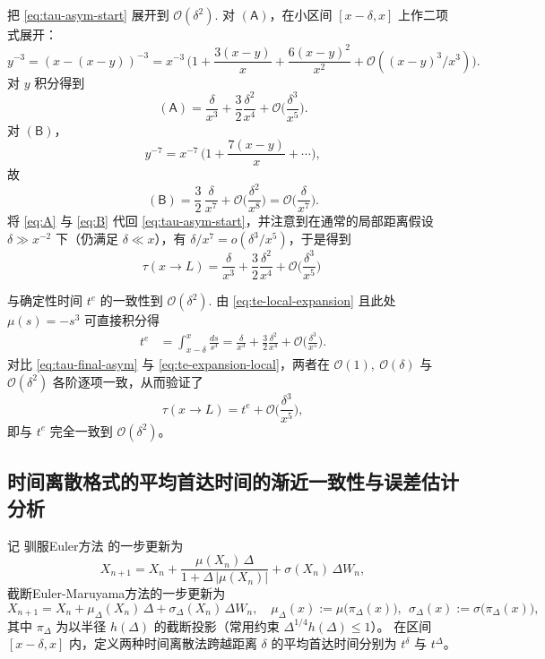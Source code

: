 把 \eqref{eq:tau-asym-start} 展开到 $\mathcal O(\delta^{2})$.	对 $\mathsf{(A)}$，在小区间 \([x-\delta,x]\) 上作二项式展开：
\[
y^{-3}=(x-(x-y))^{-3}
=x^{-3}\,\Big(1+\frac{3(x-y)}{x}+\frac{6(x-y)^{2}}{x^{2}}+\mathcal O((x-y)^{3}/x^{3})\Big).
\]
对 $y$ 积分得到
\begin{equation}\label{eq:A}
	\mathsf{(A)}
	=\frac{\delta}{x^{3}}+\frac{3}{2}\frac{\delta^{2}}{x^{4}}
	+\mathcal O\!\Big(\frac{\delta^{3}}{x^{5}}\Big).
\end{equation}
对 $\mathsf{(B)}$，
\[
y^{-7}=x^{-7}\,\Big(1+\frac{7(x-y)}{x}+\cdots\Big),
\]
故
\begin{equation}\label{eq:B}
	\mathsf{(B)}=\frac{3}{2}\,\frac{\delta}{x^{7}}
	+\mathcal O\!\Big(\frac{\delta^{2}}{x^{8}}\Big)
	=\mathcal O\!\Big(\frac{\delta}{x^{7}}\Big).
\end{equation}
将 \eqref{eq:A} 与 \eqref{eq:B} 代回 \eqref{eq:tau-asym-start}，并注意到在通常的局部距离假设
\(
\delta\gg x^{-2}
\)
下（仍满足 $\delta\ll x$），有
\(
\delta/x^{7}=o(\delta^{3}/x^{5})
\)，于是得到
\begin{equation}\label{eq:tau-final-asym}
	\tau(x\to L)=\frac{\delta}{x^{3}}
	+\frac{3}{2}\frac{\delta^{2}}{x^{4}}
	+\mathcal O\!\Big(\frac{\delta^{3}}{x^{5}}\Big)\ 
\end{equation}

与确定性时间 $t^e$ 的一致性到 $\mathcal O(\delta^{2})$. 由 \eqref{eq:te-local-expansion} 且此处 $\mu(s)=-s^{3}$ 可直接积分得
\begin{align}
	t^e&=\int_{x-\delta}^{x}\frac{ds}{s^{3}}
	=\frac{\delta}{x^{3}}+\frac{3}{2}\frac{\delta^{2}}{x^{4}}
	+\mathcal O\!\Big(\frac{\delta^{3}}{x^{5}}\Big).
	\label{eq:te-expansion-local}
\end{align}
对比 \eqref{eq:tau-final-asym} 与 \eqref{eq:te-expansion-local}，两者在
\(
\mathcal O(1),\ \mathcal O(\delta)
\)
与
\(
\mathcal O(\delta^{2})
\)
各阶逐项一致，从而验证了
\[
\tau(x\to L)=t^e+\mathcal O\!\Big(\frac{\delta^{3}}{x^{5}}\Big),
\]
即与 \(t^e\) 完全一致到 \(\mathcal O(\delta^{2})\)。




\subsection{时间离散格式的平均首达时间的渐近一致性与误差估计分析}

记 驯服Euler方法 的一步更新为
\[
X_{n+1}
=
X_n
+\frac{\mu(X_n)\,\Delta}{1+\Delta\,\lvert\mu(X_n)\rvert}
+\sigma(X_n)\,\Delta W_n,
\]
截断Euler-Maruyama方法的一步更新为
\[
X_{n+1}
=
X_n+\mu_{\Delta}(X_n)\,\Delta+\sigma_{\Delta}(X_n)\,\Delta W_n,
\quad
\mu_{\Delta}(x):=\mu\!\big(\pi_{\Delta}(x)\big),\ \ 
\sigma_{\Delta}(x):=\sigma\!\big(\pi_{\Delta}(x)\big),
\]
其中 \(\pi_{\Delta}\) 为以半径 \(h(\Delta)\) 的截断投影（常用约束 \(\Delta^{1/4}h(\Delta)\le 1\)）。
在区间 \([x-\delta,x]\) 内，定义两种时间离散法跨越距离 \(\delta\) 的平均首达时间分别为
\(t^{\delta} \) 与 \(t^{\Delta}\)。

